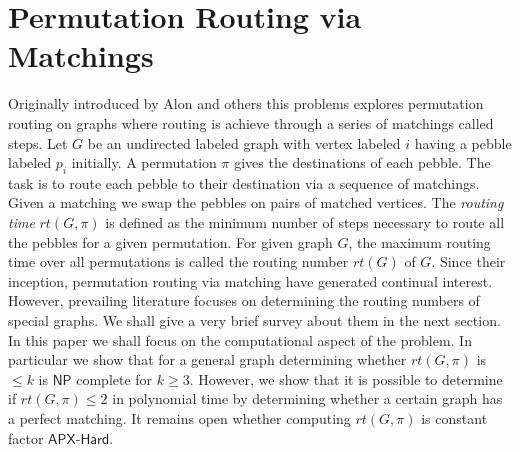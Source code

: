 \documentclass[runningheads,a4paper]{llncs}
\begin{document}
\section{Permutation Routing via Matchings}
Originally introduced by Alon and others \cite{5} this problems explores permutation routing on graphs where routing is achieve through a  series of matchings called steps. Let $G$ be an undirected labeled graph with vertex labeled $i$ having a pebble labeled $p_i$ initially. A permutation $\pi$ gives the destinations of each pebble. The task is to route each pebble to their destination via a sequence of matchings. Given a matching we swap the pebbles on pairs of matched vertices. The \textit{routing time} $rt(G,\pi)$ is defined as the minimum number of steps necessary to route all the pebbles for a given permutation. For given graph $G$, the maximum routing time over all permutations is called  the routing number $rt(G)$ of $G$. Since their inception, permutation routing via matching have generated continual interest. However, prevailing literature focuses on determining the routing numbers of special graphs. We shall give a very brief survey about them in the next section. In this paper we shall focus on the computational aspect of the problem. In particular  we show that for a general graph determining whether $rt(G,\pi)$ is $\le k$ is $\mathsf{NP}$ complete for $k \ge 3$. However, we show that it is possible to determine if $rt(G,\pi) \le 2$ in polynomial time by determining whether a certain graph has a perfect matching. It remains open whether computing $rt(G,\pi)$ is constant factor $\mathsf{APX}$-$\mathsf{Hard}$.
\end{document}
